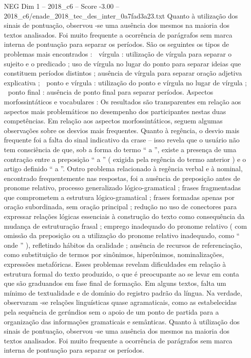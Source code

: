 \begin{textsample}{NEG Dim 1 – 2018\_c6 – Score -3.00 – 2018\_c6/enade\_2018\_tec\_des\_inter\_0a7fad3a23.txt}
Quanto à utilização dos sinais de pontuação, observou -se uma ausência dos mesmos na maioria dos textos analisados.
Foi muito frequente a ocorrência de parágrafos sem marca interna de pontuação para separar os períodos.
São os seguintes os tipos de problemas mais encontrados :  vírgula : utilização de vírgula para separar o sujeito e o predicado ; uso de vírgula no lugar do ponto para separar ideias que constituem períodos distintos ; ausência de vírgula para separar oração adjetiva explicativa ;  ponto e vírgula : utilização do ponto e vírgula no lugar de vírgula ;  ponto final : ausência de ponto final para separar períodos.
Aspectos morfossintáticos e vocabulares : Os resultados são transparentes em relação aos aspectos mais problemáticos no desempenho dos participantes nestas duas competências.
Em relação aos aspectos morfossintáticos, seguem algumas observações sobre os desvios mais frequentes.
Quanto à regência, o desvio mais frequente foi a falta do sinal indicativo da crase – isso revela que o usuário não tem consciência de que, sob a forma do termo “ a ”, existe a presença de uma contração entre a preposição “ a ” ( exigida pela regência do termo anterior ) e o artigo definido “ a ”.
Outro problema relacionado à regência verbal e à nominal, encontrado frequentemente nas respostas, foi a ausência de preposição antes de pronome relativo, processo generalizado lógico-gramatical ; frases fragmentadas que comprometem a estrutura lógico-gramatical ; frases formadas apenas por oração subordinada, sem oração principal ; redução no uso de conectores para expressar relações lógicas essenciais à construção do texto como consequência da mudança de estruturação frasal ; emprego inadequado do pronome relativo ( com omissão da preposição ou a utilização do pronome relativo inadequado, como “ onde ” ), refletindo hábitos da oralidade ; ausência de recursos de referenciação, como substituição de termos por sinônimos, hiperônimos, nominalizações, expressões metafóricas.
Esses problemas revelam dificuldades em relação à estrutura formal do texto produzido, o que é preocupante ao se levar em conta que são graduandos em fase final de formação.
Em alguns textos, falta um mínimo de textualidade e de domínio do registro padrão da língua.
Na verdade, observaram -se relações linguísticas quase agramaticais, como as estabelecidas pela sequência de gerúndios sem o apoio de um ponto de partida para a organização das informações gramaticais e semânticas.
Quanto à utilização dos sinais de pontuação, observou -se uma ausência dos mesmos na maioria dos textos analisados.
Foi muito frequente a ocorrência de parágrafos sem marca interna de pontuação para separar os períodos.

\end{textsample}
